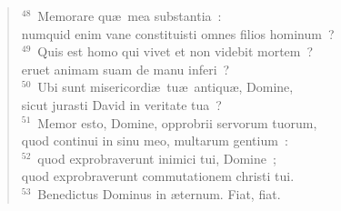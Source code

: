 \begin{flushleft}
\begin{verse}
${}^{48}$~Memorare qu\ae\ mea substantia~:\\ numquid enim vane constituisti omnes filios hominum~?\\
${}^{49}$~Quis est homo qui vivet et non videbit mortem~?\\ eruet animam suam de manu inferi~?\\
${}^{50}$~Ubi sunt misericordi\ae\ tu\ae\ antiqu\ae , Domine,\\ sicut jurasti David in veritate tua~?\\
${}^{51}$~Memor esto, Domine, opprobrii servorum tuorum,\\ quod continui in sinu meo, multarum gentium~:\\
${}^{52}$~quod exprobraverunt inimici tui, Domine~;\\ quod exprobraverunt commutationem christi tui.\\
${}^{53}$~Benedictus Dominus in \ae ternum. Fiat, fiat.\end{verse}\end{flushleft}



